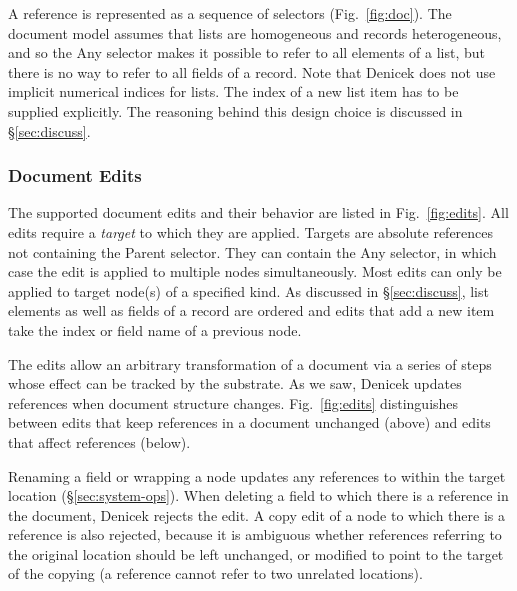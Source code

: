 \documentclass[sigconf,anonymous,screen]{acmart}
\newcommand{\ident}[1]{{\sffamily #1}}
\newcommand{\note}[1]{\textcolor{red}{#1}}
\begin{document}
A reference is represented as a sequence of selectors (Fig.~\ref{fig:doc}).
The document model assumes that lists are homogeneous and records heterogeneous, and so the
\ident{Any} selector makes it possible to refer to all elements of a list, but there is no
way to refer to all fields of a record. Note that Denicek does not use implicit numerical
indices for lists. The index of a new list item has to be supplied explicitly. The reasoning behind
this design choice is discussed in \S\ref{sec:discuss}.

\subsubsection*{Document Edits}
The supported document edits and their behavior are listed in Fig.~\ref{fig:edits}. All edits
require a \emph{target} to which they are applied. Targets are absolute references not containing the
\ident{Parent} selector. They can contain the \ident{Any} selector, in which case the edit is applied
to multiple nodes simultaneously. Most edits can only be applied to target node(s) of a specified
kind. As discussed in \S\ref{sec:discuss}, list elements as well as fields of a record are ordered
and edits that add a new item take the index or field name of a previous node.

The edits allow an arbitrary transformation of a document via a series of steps whose effect can be
tracked by the substrate. As we saw, Denicek updates references when document structure changes.
Fig.~\ref{fig:edits} distinguishes between edits that keep references in a document unchanged
(above) and edits that affect references (below).

Renaming a field or wrapping a node updates any references to within the target location
(\S\ref{sec:system-ops}). When deleting a field to which there is a reference in the document, Denicek
rejects the edit. A copy edit of a node to which there is a reference is also rejected, because it
is ambiguous whether references referring to the original location should be left unchanged,
or modified to point to the target of the copying (a reference cannot refer to two unrelated locations).


\end{document}
